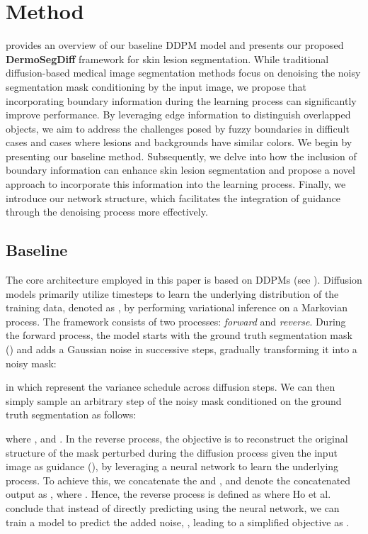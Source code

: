 \documentclass[runningheads]{llncs}
\begin{document}
\section{Method}
 provides an overview of our baseline DDPM model and presents our proposed \textbf{DermoSegDiff} framework for skin lesion segmentation. While traditional diffusion-based medical image segmentation methods focus on denoising the noisy segmentation mask conditioning by the input image, we propose that incorporating boundary information during the learning process can significantly improve performance. By leveraging edge information to distinguish overlapped objects, we aim to address the challenges posed by fuzzy boundaries in difficult cases and cases where lesions and backgrounds have similar colors. We begin by presenting our baseline method. Subsequently, we delve into how the inclusion of boundary information can enhance skin lesion segmentation and propose a novel approach to incorporate this information into the learning process. Finally, we introduce our network structure, which facilitates the integration of guidance through the denoising process more effectively.

\subsection{Baseline}
The core architecture employed in this paper is based on DDPMs \cite{ho2020denoising,wolleb2022diffusion} (see ). Diffusion models primarily utilize  timesteps to learn the underlying distribution of the training data, denoted as , by performing variational inference on a Markovian process. The framework consists of two processes: \textit{forward} and \textit{reverse}. During the forward process, the model starts with the ground truth segmentation mask () and adds a Gaussian noise in successive steps, gradually transforming it into a noisy mask:

in which  represent the variance schedule across diffusion steps. We can then simply sample an arbitrary step of the noisy mask conditioned on the ground truth segmentation as follows:


where ,  and . In the reverse process, the objective is to reconstruct the original structure of the mask perturbed during the diffusion process given the input image as guidance (), by leveraging a neural network to learn the underlying process. To achieve this, we concatenate the  and , and denote the concatenated output as , where . Hence, the reverse process is defined as 
 where Ho et al. \cite{ho2020denoising} conclude that instead of directly predicting  using the neural network, we can train a model to predict the added noise, , leading to a simplified objective as .
\end{document}
